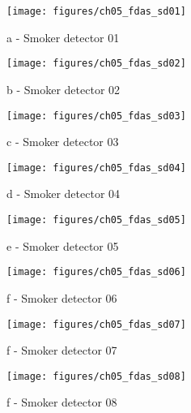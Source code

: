 \begin{figure}[!h]
	
	\begin{minipage}[b]{0.22\linewidth}
		\centering
		\texttt{[image: figures/ch05\_fdas\_sd01]}
		\caption*{a - Smoker detector 01}
	\end{minipage}
	\hspace{0.03cm}
	\begin{minipage}[b]{0.22\linewidth}
		\centering
		\texttt{[image: figures/ch05\_fdas\_sd02]}
		\caption*{b - Smoker detector 02}
	\end{minipage}
	\hspace{0.03cm}
	\begin{minipage}[b]{0.22\linewidth}
		\centering
		\texttt{[image: figures/ch05\_fdas\_sd03]}
		\caption*{c - Smoker detector 03}
	\end{minipage}
	\hspace{0.03cm}
	\begin{minipage}[b]{0.22\linewidth}
		\centering
		\texttt{[image: figures/ch05\_fdas\_sd04]}
		\caption*{d - Smoker detector 04}
	\end{minipage}
	\hspace{0.03cm}
	\begin{minipage}[b]{0.22\linewidth}
		\centering
		\texttt{[image: figures/ch05\_fdas\_sd05]}
		\caption*{e - Smoker detector 05}
	\end{minipage}
	\hspace{0.03cm}
	\begin{minipage}[b]{0.22\linewidth}
		\centering
		\texttt{[image: figures/ch05\_fdas\_sd06]}
		\caption*{f - Smoker detector 06}
	\end{minipage}
	\hspace{0.03cm}
\begin{minipage}[b]{0.22\linewidth}
	\centering
	\texttt{[image: figures/ch05\_fdas\_sd07]}
	\caption*{f - Smoker detector 07}
\end{minipage}
	\hspace{0.03cm}
\begin{minipage}[b]{0.22\linewidth}
	\centering
	\texttt{[image: figures/ch05\_fdas\_sd08]}
	\caption*{f - Smoker detector 08}
\end{minipage}

\end{figure}
